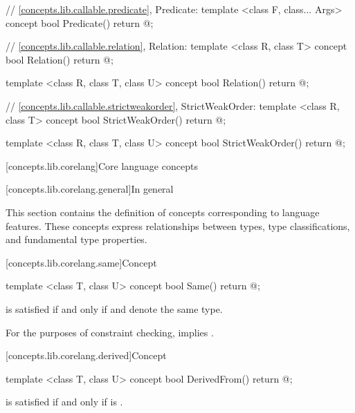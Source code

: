\begin{codeblock}
{{{{  // \ref{concepts.lib.callable.predicate}, Predicate:
  template <class F, class... Args>
  concept bool Predicate() {
    return @\seebelow@;
  }

  // \ref{concepts.lib.callable.relation}, Relation:
  template <class R, class T>
  concept bool Relation() {
    return @\seebelow@;
  }

  template <class R, class T, class U>
  concept bool Relation() {
    return @\seebelow@;
  }

  // \ref{concepts.lib.callable.strictweakorder}, StrictWeakOrder:
  template <class R, class T>
  concept bool StrictWeakOrder() {
    return @\seebelow@;
  }

  template <class R, class T, class U>
  concept bool StrictWeakOrder() {
    return @\seebelow@;
  }
}}}}
\end{codeblock}

[concepts.lib.corelang]{Core language concepts}

[concepts.lib.corelang.general]{In general}

\pnum
This section contains the definition of concepts corresponding to language features.
These concepts express relationships between types, type classifications, and
fundamental type properties.

[concepts.lib.corelang.same]{Concept }

%
\begin{itemdecl}
template <class T, class U>
concept bool Same() {
  return @\seebelow@;
}
\end{itemdecl}

\begin{itemdescr}
\pnum
{} is satisfied if and
only if  and  denote the same type.

\pnum
\remarks For the purposes of constraint checking,  implies
.
\end{itemdescr}

[concepts.lib.corelang.derived]{Concept }

%
\begin{itemdecl}
template <class T, class U>
concept bool DerivedFrom() {
  return @\seebelow@;
}
\end{itemdecl}

\begin{itemdescr}
\pnum
{} is satisfied if and only if
 is .
\end{itemdescr}

